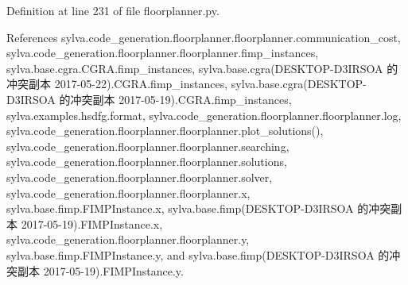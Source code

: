 Definition at line 231 of file floorplanner.\+py.



References sylva.\+code\+\_\+generation.\+floorplanner.\+floorplanner.\+communication\+\_\+cost, sylva.\+code\+\_\+generation.\+floorplanner.\+floorplanner.\+fimp\+\_\+instances, sylva.\+base.\+cgra.\+C\+G\+R\+A.\+fimp\+\_\+instances, sylva.\+base.\+cgra(\+D\+E\+S\+K\+T\+O\+P-\/\+D3\+I\+R\+S\+O\+A 的冲突副本 2017-\/05-\/22).\+C\+G\+R\+A.\+fimp\+\_\+instances, sylva.\+base.\+cgra(\+D\+E\+S\+K\+T\+O\+P-\/\+D3\+I\+R\+S\+O\+A 的冲突副本 2017-\/05-\/19).\+C\+G\+R\+A.\+fimp\+\_\+instances, sylva.\+examples.\+hsdfg.\+format, sylva.\+code\+\_\+generation.\+floorplanner.\+floorplanner.\+log, sylva.\+code\+\_\+generation.\+floorplanner.\+floorplanner.\+plot\+\_\+solutions(), sylva.\+code\+\_\+generation.\+floorplanner.\+floorplanner.\+searching, sylva.\+code\+\_\+generation.\+floorplanner.\+floorplanner.\+solutions, sylva.\+code\+\_\+generation.\+floorplanner.\+floorplanner.\+solver, sylva.\+code\+\_\+generation.\+floorplanner.\+floorplanner.\+x, sylva.\+base.\+fimp.\+F\+I\+M\+P\+Instance.\+x, sylva.\+base.\+fimp(\+D\+E\+S\+K\+T\+O\+P-\/\+D3\+I\+R\+S\+O\+A 的冲突副本 2017-\/05-\/19).\+F\+I\+M\+P\+Instance.\+x, sylva.\+code\+\_\+generation.\+floorplanner.\+floorplanner.\+y, sylva.\+base.\+fimp.\+F\+I\+M\+P\+Instance.\+y, and sylva.\+base.\+fimp(\+D\+E\+S\+K\+T\+O\+P-\/\+D3\+I\+R\+S\+O\+A 的冲突副本 2017-\/05-\/19).\+F\+I\+M\+P\+Instance.\+y.



